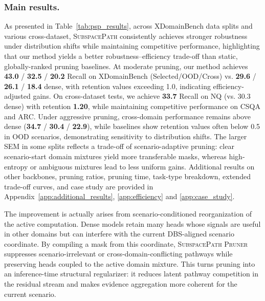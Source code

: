 \subsubsection{Main results.} 
\vspace{-1mm}

As presented in Table~\ref{tab:psp_results}, across XDomainBench data splits and various cross-dataset, 
\textsc{SubspacePath} consistently achieves stronger robustness under distribution shifts while maintaining competitive performance, highlighting that our method yields a better robustness--efficiency trade-off than static, globally-ranked pruning baselines.
At moderate pruning, our method achieves \textbf{43.0} / \textbf{32.5} / \textbf{20.2} Recall on XDomainBench (Selected/OOD/Cross) vs. \textbf{29.6} / \textbf{26.1} / \textbf{18.4} dense, with retention values exceeding 1.0, indicating efficiency-adjusted gains. On cross-dataset tests, we achieve \textbf{33.7} Recall on NQ (vs. 30.3 dense) with retention \textbf{1.20}, while maintaining competitive performance on CSQA and ARC. Under aggressive pruning, cross-domain performance remains above dense (\textbf{34.7} / \textbf{30.4} / \textbf{22.9}), while baselines show retention values often below 0.5 in OOD scenarios, demonstrating sensitivity to distribution shifts.
The larger SEM in some splits reflects a trade-off of scenario-adaptive pruning: clear scenario-start domain mixtures yield more transferable masks, whereas high-entropy or ambiguous mixtures lead to less uniform gains.
Additional results on other backbones, pruning ratios, pruning time, task-type breakdown, extended trade-off curves, and case study are provided in Appendix~\ref{app:additional_results}, \ref{app:efficiency} and \ref{app:case_study}.

The improvement is actually arises from scenario-conditioned reorganization of the active computation. Dense models retain many heads whose signals are useful in other domains but can interfere with the current DBS-aligned scenario coordinate. By compiling a mask from this coordinate, \textsc{SubspacePath Pruner} suppresses scenario-irrelevant or cross-domain-conflicting pathways while preserving heads coupled to the active domain mixture. This turns pruning into an inference-time structural regularizer: it reduces latent pathway competition in the residual stream and makes evidence aggregation more coherent for the current scenario.

\vspace{-1mm}
